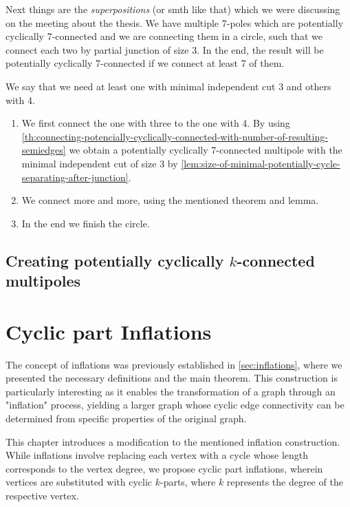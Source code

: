 \documentclass[12pt, twoside]{book}
\begin{document}
Next things are the \textit{superpositions} (or smth like that) which we were discussing on the meeting about the thesis. We have multiple 7-poles which are potentially cyclically 7-connected and we are connecting them in a circle, such that we connect each two by partial junction of size 3. In the end, the result will be potentially cyclically 7-connected if we connect at least 7 of them.

We say that we need at least one with minimal independent cut 3 and others with 4.

\begin{enumerate}
	\item We first connect the one with three to the one with 4. By using \cref{th:connecting-potencially-cyclically-connected-with-number-of-resulting-semiedges} we obtain a potentially cyclically 7-connected multipole with the minimal independent cut of size 3 by \cref{lem:size-of-minimal-potentially-cycle-separating-after-junction}.
	\item We connect more and more, using the mentioned theorem and lemma.
	\item In the end we finish the circle. 
\end{enumerate}

\section{Creating potentially cyclically $k$-connected multipoles}

\todo{}

\chapter{Cyclic part Inflations}

The concept of inflations was previously established in \cref{sec:inflations}, where we presented the necessary definitions and the main theorem. This construction is particularly interesting as it enables the transformation of a graph through an "inflation" process, yielding a larger graph whose cyclic edge connectivity can be determined from specific properties of the original graph.

This chapter introduces a modification to the mentioned inflation construction. While inflations involve replacing each vertex with a cycle whose length corresponds to the vertex degree, we propose cyclic part inflations, wherein vertices are substituted with cyclic $k$-parts, where $k$ represents the degree of the respective vertex.
\end{document}
